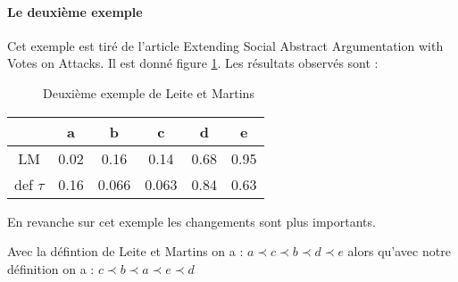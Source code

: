 \documentclass[12pt]{article}
\theoremstyle{defi}
\theoremstyle{not}
\theoremstyle{prob}
\begin{document}
        \paragraph{Le deuxième exemple\\}
          Cet exemple est tiré de l'article Extending Social Abstract Argumentation with Votes on Attacks.
          Il est donné figure \ref{fig:LM2_example}. Les résultats observés sont :

          \begin{figure}
            \centering
            \caption{Deuxième exemple de Leite et Martins}
            \label{fig:LM2_example}
          \end{figure}

          \begin{tabular}{|c|c|c|c|c|c|}
            \hline
                       & a    & b     & c     & d    & e \\
            \hline
            LM         & 0.02 & 0.16  & 0.14  & 0.68 & 0.95 \\
            \hline
            def $\tau$ & 0.16 & 0.066 & 0.063 & 0.84 & 0.63\\
            \hline
          \end{tabular}

          En revanche sur cet exemple les changements sont plus importants.

          Avec la défintion de Leite et Martins on a : $a \prec c \prec b \prec d \prec e$ alors qu'avec notre définition on a : $c \prec b \prec a \prec e \prec d$
\end{document}
